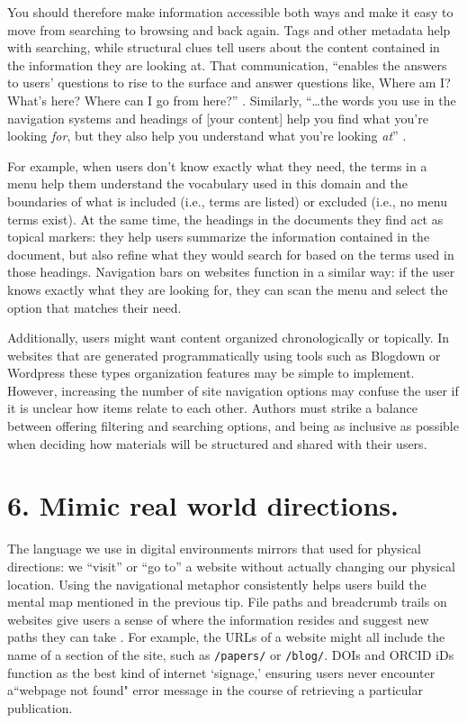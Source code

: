 \documentclass[10pt,letterpaper]{article}
\newcommand{\rulemajor}[1]{\section*{#1}}
\begin{document}
You should therefore make information accessible both ways and make it easy to
move from searching to browsing and back again. Tags and other metadata help
with searching, while structural clues tell users about the content contained in
the information they are looking at. That communication, ``enables the answers
to users' questions to rise to the surface and answer questions like, Where am
I? What's here? Where can I go from here?''  \cite{Rosenfeld2015}. Similarly,
``{\ldots}the words you use in the navigation systems and headings of [your
  content] help you find what you're looking \emph{for}, but they also help you
understand what you're looking \emph{at}'' \cite{Arango2018}.

For example, when users don't know exactly what they need, the terms in a menu
help them understand the vocabulary used in this domain and the boundaries of
what is included (i.e., terms are listed) or excluded (i.e., no menu terms
exist). At the same time, the headings in the documents they find act as topical
markers: they help users summarize the information contained in the document,
but also refine what they would search for based on the terms used in those
headings. Navigation bars on websites function in a similar way: if the user
knows exactly what they are looking for, they can scan the menu and select the
option that matches their need.

Additionally, users might want content organized chronologically or topically.
In websites that are generated programmatically using tools such as Blogdown\cite{Xie2017} 
or Wordpress \cite{Williams2015} these types organization features may be simple to implement. 
However, increasing the number of site navigation options may confuse the user if it is unclear how items relate to each other. 
Authors must strike a balance between offering filtering and searching options, 
and being as inclusive as possible when deciding how materials will be structured and shared with their users.

\rulemajor{6. Mimic real world directions.}

The language we use in digital environments mirrors that used for physical
directions: we ``visit'' or ``go to'' a website without actually changing our
physical location. Using the navigational metaphor consistently helps users
build the mental map mentioned in the previous tip. File paths and breadcrumb
trails on websites give users a sense of where the information resides and
suggest new paths they can take \cite{Krug2014}. For example, the URLs of a
website might all include the name of a section of the site, such as
\texttt{/papers/} or \texttt{/blog/}.  
DOIs and ORCID iDs function as the best kind of internet `signage,' ensuring users never encounter a``webpage not found" error message in the course of retrieving a particular publication.
\end{document}
